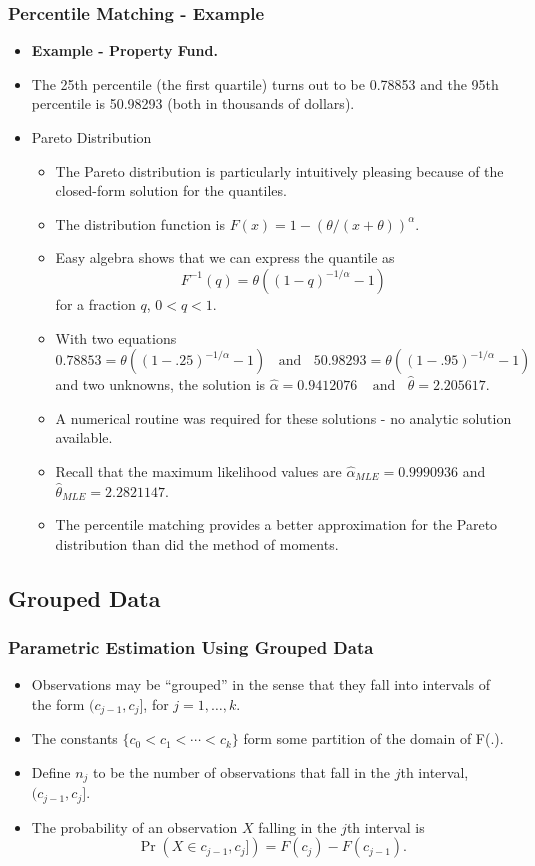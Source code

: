 \documentclass{beamer}
\begin{document}
\begin{frame}%
\frametitle{Percentile Matching - Example}
\begin{itemize}
\item \textbf{Example - Property Fund.}
\item The 25th percentile (the first quartile) turns out to be 0.78853 and the 95th percentile is 50.98293 (both in thousands of dollars).
\item Pareto Distribution
\begin{itemize}
\item The Pareto distribution is particularly intuitively pleasing because of the closed-form solution for the quantiles.
\item The distribution function is $F(x) = 1 - \left(\theta/(x+\theta )\right)^{\alpha}$.
\item Easy algebra shows that we can express the quantile as
$$F^{-1}(q) = \theta \left( (1-q)^{-1/\alpha} -1 \right) $$
for a fraction $q$, $0<q<1$.
\item With two equations
$$ 0.78853 = \theta \left( (1-.25)^{-1/\alpha} -1 \right) \ \ \ \ \text{and} \ \ \ \ 50.98293 = \theta \left( (1-.95)^{-1/\alpha} -1\right)$$
and two unknowns, the solution is $
\hat{\alpha} = 0.9412076 \ \ \ \ \ \text{and} \ \ \ \
\hat{\theta} = 2.205617 .$
\item A numerical routine was required for these solutions - no analytic solution available.
\item Recall that the maximum likelihood values are $\hat{\alpha}_{MLE} =  0.9990936$ and $\hat{\theta}_{MLE} = 2.2821147$.
\item The percentile matching provides a better approximation for the Pareto distribution than did the method of moments.
\end{itemize}
\end{itemize}
\end{frame}

\subsection{Grouped Data}

\begin{frame}%
\frametitle{Parametric Estimation Using Grouped Data}
\begin{itemize}
\item Observations may be ``grouped'' in the sense that they fall into intervals of the form $(c_{j-1}, c_j]$, for $j=1, \ldots, k$.
\item The constants $\{c_0 < c_1 < \cdots < c_k\}$ form some partition of the domain of F(.).
\item Define $n_j$ to be the number of observations that fall in the $j$th interval, $(c_{j-1}, c_j]$.
\item The probability of an observation $X$ falling in the $j$th interval is
$$\Pr\left(X \in c_{j-1}, c_j]\right) = F(c_j) - F(c_{j-1}).$$
\end{itemize}
\end{frame}
\end{document}
